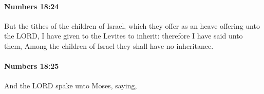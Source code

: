 		\paragraph{Numbers 18:24} %
			\label{NUMBERS-18-24}

			But the tithes of the children of Israel, which they offer as an heave offering unto the LORD, I have given to the Levites to inherit: therefore I have said unto them, Among the children of Israel they shall have no inheritance.


		\paragraph{Numbers 18:25} %
			\label{NUMBERS-18-25}

			And the LORD spake unto Moses, saying,


